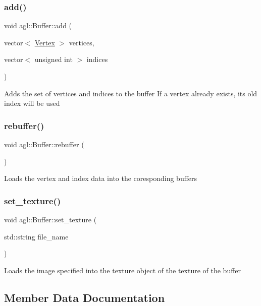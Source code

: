 \subsubsection{\texorpdfstring{add()}{add()}}
{\footnotesize\ttfamily void agl\+::\+Buffer\+::add (\begin{DoxyParamCaption}\item[{vector$<$ \mbox{\hyperlink{classagl_1_1Vertex}{Vertex}} $>$}]{vertices,  }\item[{vector$<$ unsigned int $>$}]{indices }\end{DoxyParamCaption})}

Adds the set of vertices and indices to the buffer If a vertex already exists, its old index will be used \mbox{\label{classagl_1_1Buffer_a71a6b0eb942d6eadaf949d538c50aa91}} 
\subsubsection{\texorpdfstring{rebuffer()}{rebuffer()}}
{\footnotesize\ttfamily void agl\+::\+Buffer\+::rebuffer (\begin{DoxyParamCaption}{ }\end{DoxyParamCaption})\hspace{0.3cm}{\ttfamily [private]}}

Loads the vertex and index data into the coresponding buffers \mbox{\label{classagl_1_1Buffer_a245a48fb5cfa9d8208f4891b6b784f60}} 
\subsubsection{\texorpdfstring{set\_texture()}{set\_texture()}}
{\footnotesize\ttfamily void agl\+::\+Buffer\+::set\+\_\+texture (\begin{DoxyParamCaption}\item[{std\+::string}]{file\+\_\+name }\end{DoxyParamCaption})}

Loads the image specified into the texture object of the texture of the buffer 

\subsection{Member Data Documentation}
\mbox{\label{classagl_1_1Buffer_a51cbbfb12ba689de4aea001b0f4242c1}} 
